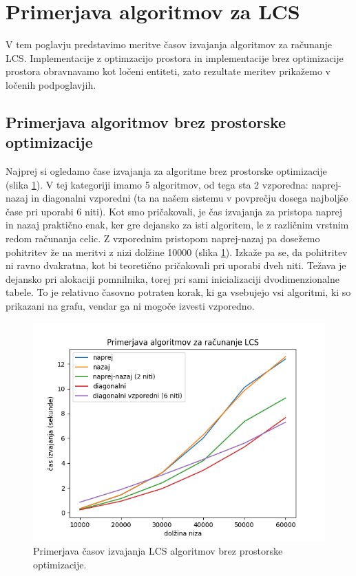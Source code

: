 \documentclass[a4paper,12pt,openright]{book}
\begin{document}
\section{Primerjava algoritmov za LCS}

V tem poglavju predstavimo meritve časov izvajanja algoritmov za računanje LCS. Implementacije z optimzacijo prostora in implementacije brez optimizacije prostora obravnavamo kot ločeni entiteti, zato rezultate meritev prikažemo v ločenih podpoglavjih. 

\subsection{Primerjava algoritmov brez prostorske optimizacije}

Najprej si ogledamo čase izvajanja za algoritme brez prostorske optimizacije (slika \ref{comparison1}). V tej kategoriji imamo 5 algoritmov, od tega sta 2 vzporedna: naprej-nazaj in diagonalni vzporedni (ta na našem sistemu v povprečju dosega najboljše čase pri uporabi 6 niti). Kot smo pričakovali, je čas izvajanja za pristopa naprej in nazaj praktično enak, ker gre dejansko za isti algoritem, le z različnim vrstnim redom računanja celic. Z vzporednim pristopom naprej-nazaj pa dosežemo pohitritev že na meritvi z nizi dolžine 10000 (slika \ref{comparison1}). Izkaže pa se, da pohitritev ni ravno dvakratna, kot bi teoretično pričakovali pri uporabi dveh niti. Težava je dejansko pri alokaciji pomnilnika, torej pri sami inicializaciji dvodimenzionalne tabele. To je relativno časovno potraten korak, ki ga vsebujejo vsi algoritmi, ki so prikazani na grafu, vendar ga ni mogoče izvesti vzporedno. 

\begin{figure}[htb]
\centering
\includegraphics[width=1.0\textwidth]{plots/LCStotal.png}
\caption{Primerjava časov izvajanja LCS algoritmov brez prostorske optimizacije.}
\label{comparison1}
\end{figure}
\end{document}

